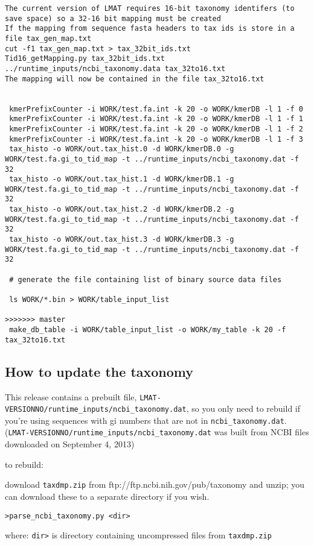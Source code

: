 \documentclass[11pt]{article}
\newcommand{\lmatver}{VERSIONNO}
\begin{document}
\begin{verbatim}
The current version of LMAT requires 16-bit taxonomy identifers (to save space) so a 32-16 bit mapping must be created
If the mapping from sequence fasta headers to tax ids is store in a file tax_gen_map.txt
cut -f1 tax_gen_map.txt > tax_32bit_ids.txt
Tid16_getMapping.py tax_32bit_ids.txt ../runtime_inputs/ncbi_taxonomy.data tax_32to16.txt
The mapping will now be contained in the file tax_32to16.txt


 kmerPrefixCounter -i WORK/test.fa.int -k 20 -o WORK/kmerDB -l 1 -f 0
 kmerPrefixCounter -i WORK/test.fa.int -k 20 -o WORK/kmerDB -l 1 -f 1
 kmerPrefixCounter -i WORK/test.fa.int -k 20 -o WORK/kmerDB -l 1 -f 2
 kmerPrefixCounter -i WORK/test.fa.int -k 20 -o WORK/kmerDB -l 1 -f 3
 tax_histo -o WORK/out.tax_hist.0 -d WORK/kmerDB.0 -g WORK/test.fa.gi_to_tid_map -t ../runtime_inputs/ncbi_taxonomy.dat -f 32
 tax_histo -o WORK/out.tax_hist.1 -d WORK/kmerDB.1 -g WORK/test.fa.gi_to_tid_map -t ../runtime_inputs/ncbi_taxonomy.dat -f 32
 tax_histo -o WORK/out.tax_hist.2 -d WORK/kmerDB.2 -g WORK/test.fa.gi_to_tid_map -t ../runtime_inputs/ncbi_taxonomy.dat -f 32
 tax_histo -o WORK/out.tax_hist.3 -d WORK/kmerDB.3 -g WORK/test.fa.gi_to_tid_map -t ../runtime_inputs/ncbi_taxonomy.dat -f 32

 # generate the file containing list of binary source data files

 ls WORK/*.bin > WORK/table_input_list

>>>>>>> master
 make_db_table -i WORK/table_input_list -o WORK/my_table -k 20 -f tax_32to16.txt
\end{verbatim}

\subsection{How to update the taxonomy}
\label{sec:upd}

This release contains a prebuilt file, \texttt{LMAT-\lmatver/runtime\_inputs/ncbi\_taxonomy.dat},
so you only need to rebuild if you're using sequences with gi numbers
that are not in \texttt{ncbi\_taxonomy.dat}.  (\texttt{LMAT-\lmatver/runtime\_inputs/ncbi\_taxonomy.dat} 
was built from NCBI files downloaded on September 4, 2013)

to rebuild:

download \texttt{taxdmp.zip} from ftp://ftp.ncbi.nih.gov/pub/taxonomy and unzip;
you can download these to a separate directory if you wish.

\texttt{>parse\_ncbi\_taxonomy.py <dir>}

where: \texttt{dir>} is directory containing uncompressed files from \texttt{taxdmp.zip}
\end{document}
